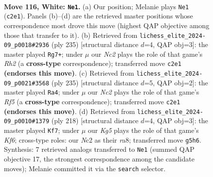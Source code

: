 \documentclass[11pt]{article}
\begin{document}
\clearpage

\begin{figure}[p]\centering
\begin{subfigure}{0.46\textwidth}\centering
\resizebox{\linewidth}{!}{%
\newchessgame
\chessboard[
  setfen={8/5R2/8/3k2K1/6P1/1r6/2N5/8 w - - 15 116},
  showmover=false,
  pgfstyle=straightmove, color=movearrow, markmove={c2-e1}
]}
\caption{}
\end{subfigure}\hfill
\begin{subfigure}{0.46\textwidth}\centering
\resizebox{\linewidth}{!}{%
\newchessgame
\chessboard[
  setfen={8/7r/1R6/8/5p2/5k2/8/6K1 b - - 35 118},
  showmover=false,
  pgfstyle=straightmove, color=movearrow, markmove={h7-g7}
]}
\caption{}
\end{subfigure}
\\[4pt]
\begin{subfigure}{0.46\textwidth}\centering
\resizebox{\linewidth}{!}{%
\newchessgame
\chessboard[
  setfen={8/8/8/8/5r2/6R1/4K2p/7k b - - 27 118},
  showmover=false,
  pgfstyle=straightmove, color=movearrow, markmove={f4-a4}
]}
\caption{}
\end{subfigure}\hfill
\begin{subfigure}{0.46\textwidth}\centering
\resizebox{\linewidth}{!}{%
\newchessgame
\chessboard[
  setfen={r7/7k/5K2/5P2/8/4R3/8/8 w - - 2 110},
  showmover=false,
  pgfstyle=straightmove, color=movearrow, markmove={f6-f7}
]}
\caption{}
\end{subfigure}
\caption{\textbf{Move 116, White: \texttt{Ne1}.} (a) Our position; Melanie plays \texttt{Ne1} (\texttt{c2e1}). Panels (b)--(d) are the retrieved master positions whose correspondence most drove this move (highest QAP objective among those that transfer to it). (b) Retrieved from \texttt{lichess\_elite\_2024-09\_p0018\#2936} (ply 235) [structural distance $d$=4, QAP obj=3]: the master played \texttt{Rg7+}; under $\mu$ our \emph{Nc2} plays the role of that game's \emph{Rh2} (a \textbf{cross-type} correspondence); transferred move \texttt{c2e1} \textbf{(endorses this move)}. (c) Retrieved from \texttt{lichess\_elite\_2024-09\_p0021\#3568} (ply 235) [structural distance $d$=5, QAP obj=2]: the master played \texttt{Ra4}; under $\mu$ our \emph{Nc2} plays the role of that game's \emph{Rf5} (a \textbf{cross-type} correspondence); transferred move \texttt{c2e1} \textbf{(endorses this move)}. (d) Retrieved from \texttt{lichess\_elite\_2024-09\_p0010\#1379} (ply 218) [structural distance $d$=4, QAP obj=3]: the master played \texttt{Kf7}; under $\mu$ our \emph{Kg5} plays the role of that game's \emph{Kf6}; cross-type roles: our \emph{N}c2 as their \emph{r}a8; transferred move \texttt{g5h6}. Synthesis: 7 retrieved analogs transferred to \texttt{Ne1} (summed QAP objective 17, the strongest correspondence among the candidate moves); Melanie committed it via the \texttt{search} selector.}
\label{fig:thought-m230}
\end{figure}
\end{document}
